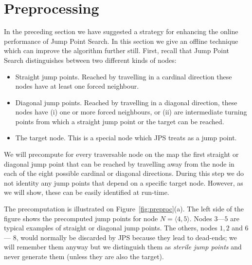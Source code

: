 \section{Preprocessing}
\label{sec::preprocessing}
In the preceding section we have suggested a strategy for enhancing the
online performance of Jump Point Search.  In this section we give an offline
technique which can improve the algorithm further still. First, recall that 
Jump Point Search distinguishes between two different kinds of
nodes:
\begin{itemize}
\item Straight jump points. Reached by travelling in a
cardinal direction these nodes have at least one forced neighbour.
\item Diagonal jump points. Reached by travelling in a diagonal direction, 
these nodes have (i) one or more forced neighbours, or (ii) are 
intermediate turning points from which a straight jump point or the 
target can be reached.
\item The target node. This is a special node which JPS treats as a jump point.
\end{itemize}

We will precompute for every traversable node on the map the first
straight or diagonal jump point that can be reached by travelling 
away from the node in each of the eight possible cardinal or diagonal 
directions. During this step we do not identity any jump points that 
depend on a specific target node.  However, as we will show, these 
can be easily identified at run-time. 


The precomputation is illustrated on Figure~\ref{fig:preproc}(a).
The left side of the figure shows the precomputed jump points 
for node $N = \langle 4,5\rangle$.  
Nodes $3$---$5$ are typical examples of straight or diagonal 
jump points.  
The others, nodes $1, 2$ and $6$ --- $8$, would normally be discarded 
by JPS because they lead to dead-ends; we will remember them 
anyway but we distinguish them as \emph{sterile jump points} and never
generate them (unless they are also the target).

